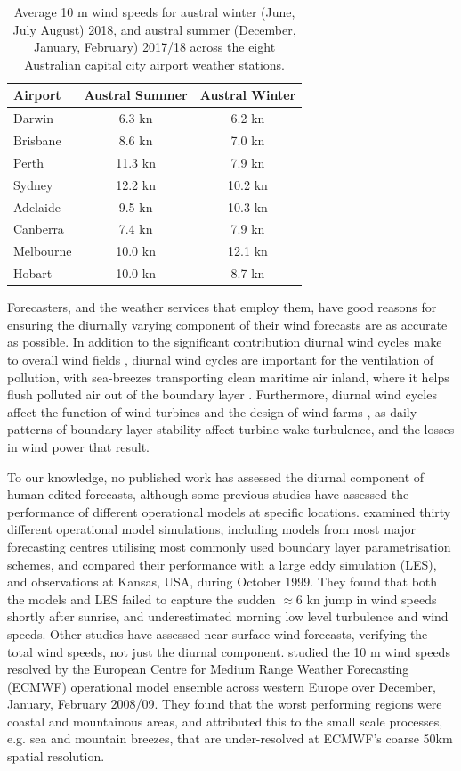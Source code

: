 \documentclass[twocol]{ametsoc}
\begin{document}
\begin{table}
\begin{center}
\begin{tabular}{l |c|c}
Airport & Austral Summer & Austral Winter \\
\hline
Darwin  & 6.3 kn& 6.2 kn \\
Brisbane  & 8.6 kn& 7.0 kn \\
Perth  & 11.3 kn& 7.9 kn \\
Sydney  & 12.2 kn & 10.2 kn \\
Adelaide  & 9.5 kn & 10.3 kn \\
Canberra  & 7.4 kn & 7.9 kn \\
Melbourne  & 10.0 kn & 12.1 kn \\
Hobart & 10.0 kn & 8.7 kn
\end{tabular}
\caption{Average 10 m wind speeds for austral winter (June, July August) 2018, and austral summer (December, January, February) 2017/18 across the eight Australian capital city airport weather stations.}
\label{Tab:Speeds}
\end{center}
\end{table}

Forecasters, and the weather services that employ them, have good reasons for ensuring the diurnally varying component of their wind forecasts are as accurate as possible. In addition to the significant contribution diurnal wind cycles make to overall wind fields \citep[e.g.][]{dai99}, diurnal wind cycles are important for the ventilation of pollution, with sea-breezes transporting clean maritime air inland, where it helps flush polluted air out of the boundary layer \citep{miller03, physick92}. Furthermore, diurnal wind cycles affect the function of wind turbines \citep{englberger18} and the design of wind farms \citep{abkar16}, as daily patterns of boundary layer stability affect turbine wake turbulence, and the losses in wind power that result.

To our knowledge, no published work has assessed the diurnal component of human edited forecasts, although some previous studies have assessed the performance of different operational models at specific locations. \citet{svensson11} examined thirty different operational model simulations, including models from most major forecasting centres utilising most commonly used boundary layer parametrisation schemes, and compared their performance with a large eddy simulation (LES), and observations at Kansas, USA, during October 1999. They found that both the models and LES failed to capture the sudden $\approx 6$ kn jump in wind speeds shortly after sunrise, and underestimated morning low level turbulence and wind speeds. Other studies have assessed near-surface wind forecasts, verifying the total wind speeds, not just the diurnal component. \citet{pinson12} studied the 10 m wind speeds resolved by the European Centre for Medium Range Weather Forecasting (ECMWF) operational model ensemble across western Europe over December, January, February 2008/09. They found that the worst performing regions were coastal and mountainous areas, and attributed this to the small scale processes, e.g. sea and mountain breezes, that are under-resolved at ECMWF's coarse 50km spatial resolution.
\end{document}
